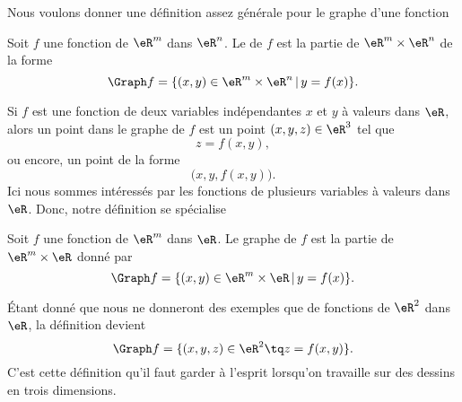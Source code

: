 Nous voulons donner une définition assez générale pour le graphe d'une fonction
\begin{definition}
  Soit $f$ une fonction de $\eR^m$ dans $\eR^n$. Le  de $f$ est la partie de $\eR^m\times \eR^n$ de la forme
  \begin{equation}
    \Graph f= \{ (x,y)\in \eR^m\times \eR^n \,|\, y=f(x)\}.
  \end{equation}
\end{definition}
Si $f$ est une fonction de deux variables indépendantes $x$ et $y$ à valeurs dans $\eR$, alors un point dans le graphe de $f$ est un point $(x,y,z)\in\eR^3$ tel que
\begin{equation}
	z=f(x,y),
\end{equation}
ou encore, un point de la forme
\begin{equation}
	\big( x,y,f(x,y) \big).
\end{equation}
Ici nous sommes intéressés par les fonctions de plusieurs variables à valeurs dans $\eR$. Donc, notre définition se spécialise 
\begin{definition}
  Soit $f$ une fonction de $\eR^m$ dans $\eR$. Le graphe de $f$ est la partie de $\eR^m\times \eR$ donné par
  \begin{equation}
    \Graph f= \{ (x,y)\in \eR^m\times \eR \,|\, y=f(x)\}.
  \end{equation}
\end{definition}  
Étant donné que nous ne donneront des exemples que de fonctions de $\eR^2$ dans $\eR$, la définition devient
\begin{equation}
	\Graph f= \{ (x,y,z)\in\eR^2\tq z=f(x,y) \}.
\end{equation}
C'est cette définition qu'il faut garder à l'esprit lorsqu'on travaille sur des dessins en trois dimensions.


